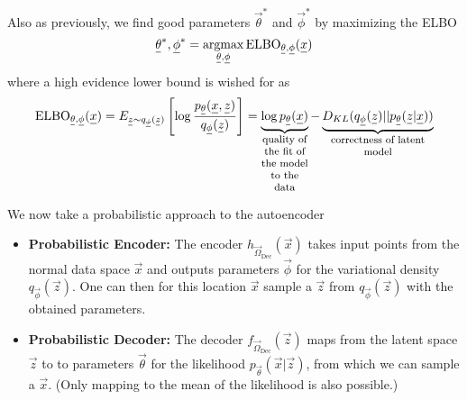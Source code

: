 Also as previously, we find good parameters $\vec{\theta}^*$ and $\vec{\phi}^*$ by maximizing the ELBO
\begin{equation}
    \vec{\theta}^*, \vec{\phi}^* = \argmax_{\vec{\theta}, \vec{\phi}} \text{ELBO}_{\vec{\theta}, \vec{\phi}}(\vec{x})
\end{equation}
where a high evidence lower bound is wished for as
\begin{equation}
    \text{ELBO}_{\vec{\theta}, \vec{\phi}}(\vec{x}) = E_{\vec{z} \sim q_{\vec{\phi}}(\vec{z})} \left[ \log \frac{p_\vec{\theta}(\vec{x},\vec{z})}{q_{\vec{\phi}}(\vec{z})} \right] = \explain{\log p_\vec{\theta}(\vec{x})}{quality of the fit of the model to the data} - \explain{D_{KL}(q_{\vec{\phi}}(\vec{z}) || p_{\vec{\theta}}(\vec{z}|\vec{x}))}{correctness of latent model}
\end{equation}

We now take a probabilistic approach to the autoencoder
\begin{itemize}
    \item \textbf{Probabilistic Encoder:} The encoder $h_{\vec{\Omega}_{\text{Dec}}}(\vec{x})$ takes input points from the normal data space $\vec{x}$ and outputs
    parameters $\vec{\phi}$ for the variational density $q_{\vec{\phi}}(\vec{z})$. One can then
    for this location $\vec{x}$ sample a $\vec{z}$ from $q_{\vec{\phi}}(\vec{z})$ with the
    obtained parameters. 
    \item \textbf{Probabilistic Decoder:} The decoder $f_{\vec{\Omega}_{\text{Dec}}}(\vec{z})$ maps from the latent space $\vec{z}$ to 
    to parameters $\vec{\theta}$ for the likelihood $p_{\vec{\theta}}(\vec{x}|\vec{z})$, from 
    which we can sample a $\vec{x}$. (Only mapping to the mean of the likelihood is also possible.)
\end{itemize}


